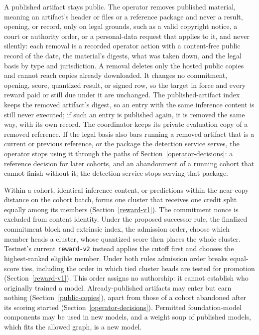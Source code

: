 A published artifact stays public. The operator removes published material,
meaning an artifact's header or files or a reference package and never a
result, opening, or record, only on legal grounds, such as a valid copyright
notice, a court or authority order, or a personal-data request that applies to
it, and never silently: each removal is a recorded operator action with a
content-free public record of the date, the material's digests, what was taken
down, and the legal basis by type and jurisdiction. A removal deletes only the
hosted public copies and cannot reach copies already downloaded. It changes no
commitment, opening, score, quantized result, or signed row, so the target in
force and every reward paid or still due under it are unchanged. The
published-artifact index keeps the removed artifact's digest, so an entry with
the same inference content is still never executed; if such an entry is
published again, it is removed the same way, with its own record. The
coordinator keeps its private evaluation copy of a removed reference. If the
legal basis also bars running a removed artifact that is a current or previous
reference, or the package the detection service serves, the operator stops
using it through the paths of Section~\ref{operator-decisions}: a reference
decision for later cohorts, and an abandonment of a running cohort that cannot
finish without it; the detection service stops serving that package.

Within a cohort, identical inference content, or predictions within the
near-copy distance on the cohort batch, forms one cluster that receives one
credit split equally among its members (Section~\ref{reward-v1}). The
commitment nonce is excluded from content identity. Under the proposed successor
rule, the finalized commitment block and extrinsic index, the admission order,
choose which member heads a cluster, whose quantized score then places the whole
cluster. Testnet's current \texttt{reward-v2} instead applies the cutoff first
and chooses the highest-ranked eligible member. Under both rules admission order
breaks equal-score ties, including the order in which tied cluster heads are
tested for promotion (Section~\ref{reward-v1}). This order
assigns no authorship: it cannot establish who originally trained a model.
Already-published artifacts may enter but earn nothing
(Section~\ref{public-copies}), apart from those of a cohort abandoned after its
scoring started (Section~\ref{operator-decisions}). Permitted foundation-model components may be used
in new models, and a weight soup of published models, which fits the allowed
graph, is a new model.
